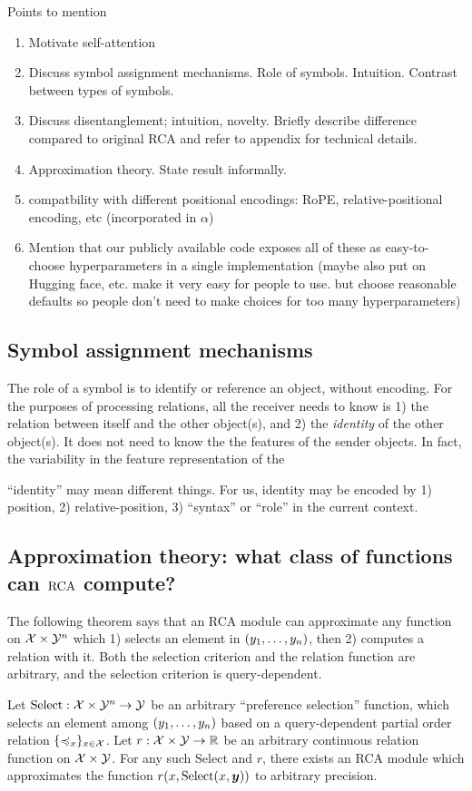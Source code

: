 Points to mention
\begin{enumerate}
  \item Motivate self-attention 
  \item Discuss symbol assignment mechanisms. Role of symbols. Intuition. Contrast between types of symbols.
  \item Discuss disentanglement; intuition, novelty. Briefly describe difference compared to original RCA and refer to appendix for technical details.
  \item Approximation theory. State result informally.
  \item compatbility with different positional encodings: RoPE, relative-positional encoding, etc (incorporated in $\alpha$)
  \item Mention that our publicly available code exposes all of these as easy-to-choose hyperparameters in a single implementation (maybe also put on Hugging face, etc. make it very easy for people to use. but choose reasonable defaults so people don't need to make choices for too many hyperparameters)
\end{enumerate}

\subsection{Symbol assignment mechanisms}
The role of a symbol is to identify or reference an object, without encoding. For the purposes of processing relations, all the receiver needs to know is 1) the relation between itself and the other object(s), and 2) the \textit{identity} of the other object(s). It does not need to know the the features of the sender objects. In fact, the variability in the feature representation of the 

``identity'' may mean different things. For us, identity may be encoded by 1) position, 2) relative-position, 3) ``syntax'' or ``role'' in the current context.

\subsection{Approximation theory: what class of functions can $\mathrm{RCA}$ compute?}

The following theorem says that an RCA module can approximate any function on ${\mathcal{X}} \times {\mathcal{Y}}^n$ which 1) selects an element in $(y_1, \ldots, y_n)$, then 2) computes a relation with it. Both the selection criterion and the relation function are arbitrary, and the selection criterion is query-dependent.
\begin{theorem}[Informal]
  Let $\mathrm{Select}: {\mathcal{X}} \times {\mathcal{Y}}^n \to {\mathcal{Y}}$ be an arbitrary ``preference selection'' function, which selects an element among $(y_1, \ldots, y_n)$ based on a query-dependent partial order relation $\{\preccurlyeq_x\}_{x \in {\mathcal{X}}}$. Let $r: {\mathcal{X}} \times {\mathcal{Y}} \to \mathbb{R}$ be an arbitrary continuous relation function on ${\mathcal{X}} \times {\mathcal{Y}}$. For any such $\mathrm{Select}$ and $r$, there exists an RCA module which approximates the function $r(x, \mathrm{Select}(x, \bm{y}))$ to arbitrary precision.
\end{theorem}